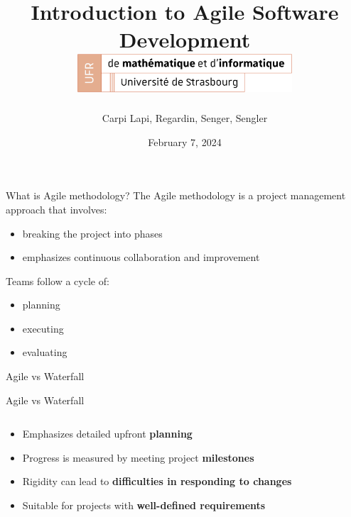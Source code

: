 \documentclass[10pt]{beamer}
\title[Introduction to Agile Software Development]{
  Introduction to Agile Software Development \\
  \vspace{1cm}
    \includegraphics[width=0.6\textwidth]{images/logo_Uni.png}}
\author[SuperAgile]{Carpi Lapi, Regardin, Senger, Sengler}
\date[February 7, 2024]{February 7, 2024}
\begin{document}
\frame{\titlepage}

\begin{frame}{What is Agile methodology?}
The Agile methodology is a project management approach that involves:
\begin{itemize}
    \item<2-> breaking the project into phases
    \item<3-> emphasizes continuous collaboration and improvement \\
    \vspace{1cm}
\end{itemize}

Teams follow a cycle of: 
\begin{itemize}
    \item<4-> planning
    \item<5-> executing
    \item<6-> evaluating
\end{itemize}

\end{frame}

\begin{frame}{Agile vs Waterfall}
  \vspace{0.5cm}
\end{frame}

\begin{frame}{Agile vs Waterfall}
  \vspace{0.5cm}
  \begin{columns}[T]

    \begin{column}{0.5\textwidth}
      \vspace{2cm}
      \begin{itemize}
        \item<2-> Emphasizes detailed upfront \textbf{planning}
        \item<3-> Progress is measured by meeting project \textbf{milestones}
        \item<4-> Rigidity can lead to \textbf{difficulties in responding to changes}
        \item<5-> Suitable for projects with \textbf{well-defined requirements}
      \end{itemize}
    \end{column}

    \begin{column}{0.5\textwidth}
    \end{column}

  \end{columns}
\end{frame}
\end{document}
